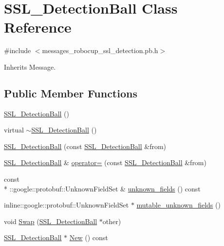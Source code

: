\hypertarget{class_s_s_l___detection_ball}{\section{S\-S\-L\-\_\-\-Detection\-Ball Class Reference}
\label{class_s_s_l___detection_ball}
}


{\ttfamily \#include $<$messages\-\_\-robocup\-\_\-ssl\-\_\-detection.\-pb.\-h$>$}



Inherits Message.

\subsection*{Public Member Functions}
\begin{DoxyCompactItemize}
\item 
\hyperlink{class_s_s_l___detection_ball_a8b50fc45a5051f667f056595a3717b22}{S\-S\-L\-\_\-\-Detection\-Ball} ()
\item 
virtual \hyperlink{class_s_s_l___detection_ball_ab7c5999d414d29925b4597ffb71ac095}{$\sim$\-S\-S\-L\-\_\-\-Detection\-Ball} ()
\item 
\hyperlink{class_s_s_l___detection_ball_a82dd599a1721096f7fcd8471eb6660aa}{S\-S\-L\-\_\-\-Detection\-Ball} (const \hyperlink{class_s_s_l___detection_ball}{S\-S\-L\-\_\-\-Detection\-Ball} \&from)
\item 
\hyperlink{class_s_s_l___detection_ball}{S\-S\-L\-\_\-\-Detection\-Ball} \& \hyperlink{class_s_s_l___detection_ball_a85a343fa0957282f0e8676d46c549800}{operator=} (const \hyperlink{class_s_s_l___detection_ball}{S\-S\-L\-\_\-\-Detection\-Ball} \&from)
\item 
const \\*
\-::google\-::protobuf\-::\-Unknown\-Field\-Set \& \hyperlink{class_s_s_l___detection_ball_ab35d3cfcfe82ce41be93765c9ca24666}{unknown\-\_\-fields} () const 
\item 
inline\-::google\-::protobuf\-::\-Unknown\-Field\-Set $\ast$ \hyperlink{class_s_s_l___detection_ball_a038e02e7851b6e129f10884416d0bd14}{mutable\-\_\-unknown\-\_\-fields} ()
\item 
void \hyperlink{class_s_s_l___detection_ball_a381f7671916a343facc4e42d27ca197b}{Swap} (\hyperlink{class_s_s_l___detection_ball}{S\-S\-L\-\_\-\-Detection\-Ball} $\ast$other)
\item 
\hyperlink{class_s_s_l___detection_ball}{S\-S\-L\-\_\-\-Detection\-Ball} $\ast$ \hyperlink{class_s_s_l___detection_ball_a60e0dc21d1edc7ec0640a268456325d3}{New} () const 

\end{DoxyCompactItemize}
